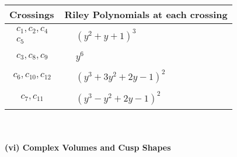 \documentclass[1p]{elsarticle_modified}
\theoremstyle{definition}
\begin{document}
\begin{tabular}{m{50pt}|m{274pt}}
Crossings & \hspace{64pt}Riley Polynomials at each crossing \\
\hline $$\begin{aligned}c_{1},c_{2},c_{4}\\c_{5}\end{aligned}$$&$\begin{aligned}
&(y^2+y+1)^3
\end{aligned}$\\
\hline $$\begin{aligned}c_{3},c_{8},c_{9}\end{aligned}$$&$\begin{aligned}
&y^6
\end{aligned}$\\
\hline $$\begin{aligned}c_{6},c_{10},c_{12}\end{aligned}$$&$\begin{aligned}
&(y^3+3 y^2+2 y-1)^2
\end{aligned}$\\
\hline $$\begin{aligned}c_{7},c_{11}\end{aligned}$$&$\begin{aligned}
&(y^3- y^2+2 y-1)^2
\end{aligned}$\\
\hline
\end{tabular}\\~\\
\newpage\flushleft \textbf{(vi) Complex Volumes and Cusp Shapes}
\end{document}
